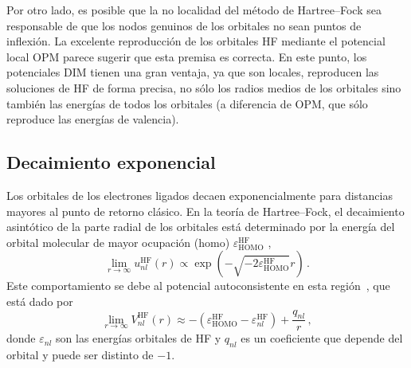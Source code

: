 Por otro lado, es posible que la no localidad del método de 
Hartree--Fock sea responsable de que los nodos genuinos de los orbitales 
no sean puntos de inflexión. La excelente reproducción de los orbitales 
HF mediante el potencial local OPM parece sugerir que esta premisa es 
correcta. En este punto, los potenciales DIM tienen una gran ventaja, ya 
que son locales, reproducen las soluciones de HF de forma precisa, no 
sólo los radios medios de los orbitales sino también las energías de 
todos los orbitales (a diferencia de OPM, que sólo reproduce las 
energías de valencia).

\subsection{Decaimiento exponencial}
\label{subsec:decaimientoHF}

Los orbitales de los electrones ligados decaen exponencialmente para 
distancias mayores al punto de retorno clásico. En la teoría de 
Hartree--Fock, el decaimiento asintótico de la parte radial de los 
orbitales está determinado por la energía del orbital molecular de mayor 
ocupación (\acs{homo}) $\varepsilon_{\mathrm{HOMO}}^{\mathrm{HF}}$ 
\cite{Handy:69,Handler:80,Ishida:92},
\begin{equation}
\lim_{r \rightarrow \infty} u_{nl}^{\mathrm{HF}}(r) \propto
\exp(- \sqrt{- 2 \varepsilon_{\mathrm{HOMO}}^{\mathrm{HF}} } r )  \, .
\label{eq:uHFasympt}
\end{equation}
Este comportamiento se debe al potencial autoconsistente en esta 
región~\cite{Cinal:10}, 
que está dado por
\begin{equation}
\lim_{r\rightarrow\infty} V_{nl}^{\mathrm{HF}}(r) \approx
-\left(\varepsilon_{\mathrm{HOMO}}^{\mathrm{HF}}
-\varepsilon_{nl}^{\mathrm{HF}}\right)+\frac{q_{nl}}{r}\,,\label{eq:VHFasympt}
\end{equation}
donde $\varepsilon_{nl}$ son las energías orbitales de HF y $q_{nl}$ es 
un coeficiente que depende del orbital y puede ser distinto de $-1$.

